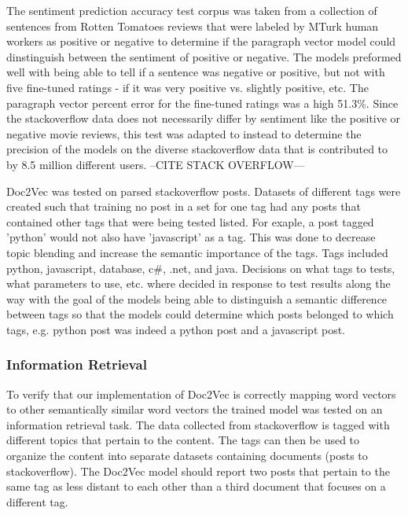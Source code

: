 The sentiment prediction accuracy test corpus was taken from a collection of sentences from Rotten Tomatoes reviews that were labeled by MTurk human workers as positive or negative to determine if the paragraph vector model could dinstinguish between the sentiment of positive or negative. The models preformed well with being able to tell if a sentence was negative or positive, but not with five fine-tuned ratings - if it was very positive vs. slightly positive, etc. The paragraph vector percent error for the fine-tuned ratings was a high 51.3\%. Since the stackoverflow data does not necessarily differ by sentiment like the positive or negative movie reviews, this test was adapted to instead to determine the precision of the models on the diverse stackoverflow data that is contributed to by 8.5 million different users. --CITE STACK OVERFLOW---

Doc2Vec was tested on parsed stackoverflow posts. Datasets of different tags were created such that training no post in a set for one tag had any posts that contained other tags that were being tested listed. For exaple, a post tagged 'python' would not also have 'javascript' as a tag. This was done to decrease topic blending and increase the semantic importance of the tags. Tags included python, javascript, database, c\#, .net, and java. Decisions on what tags to tests, what parameters to use, etc. where decided in response to test results along the way with the goal of the models being able to distinguish a semantic difference between tags so that the models could determine which posts belonged to which tags, e.g. python post was indeed a python post and a javascript post.

\subsubsection{Information Retrieval}

To verify that our implementation of Doc2Vec is correctly mapping word vectors to other semantically similar word vectors the trained model was tested on an information retrieval task. The data collected from stackoverflow is tagged with different topics that pertain to the content. The tags can then be used to organize the content into separate datasets containing documents (posts to stackoverflow). The Doc2Vec model should report two posts that pertain to the same tag as less distant to each other than a third document that focuses on a different tag.

